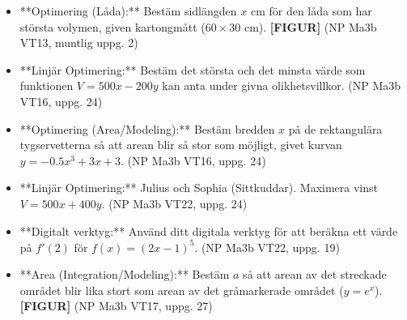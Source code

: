 \documentclass{article}
\begin{document}
\begin{itemize}
    \item **Optimering (Låda):** Bestäm sidlängden $x$ cm för den låda som har största volymen, given kartongmått ($60 \times 30$ cm). \textbf{[FIGUR]} (NP Ma3b VT13, muntlig uppg. 2)
    \item **Linjär Optimering:** Bestäm det största och det minsta värde som funktionen $V = 500x - 200y$ kan anta under givna olikhetsvillkor. (NP Ma3b VT16, uppg. 24)
    \item **Optimering (Area/Modeling):** Bestäm bredden $x$ på de rektangulära tygservetterna så att arean blir så stor som möjligt, givet kurvan $y = -0.5x^3 + 3x + 3$. (NP Ma3b VT16, uppg. 24)
    \item **Linjär Optimering:** Julius och Sophia (Sittkuddar). Maximera vinst $V=500x+400y$. (NP Ma3b VT22, uppg. 24)
    \item **Digitalt verktyg:** Använd ditt digitala verktyg för att beräkna ett värde på $f'(2)$ för $f(x) = (2x-1)^5$. (NP Ma3b VT22, uppg. 19)
    \item **Area (Integration/Modeling):** Bestäm $a$ så att arean av det streckade området blir lika stort som arean av det gråmarkerade området ($y=e^x$). \textbf{[FIGUR]} (NP Ma3b VT17, uppg. 27)
\end{itemize}
\end{document}
